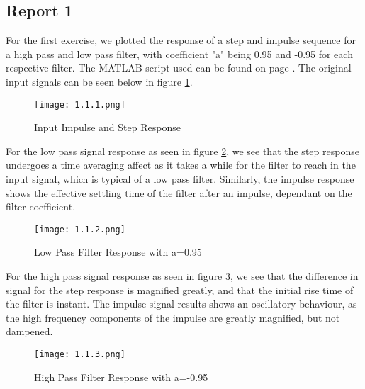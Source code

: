 \subsection*{Report 1}

	For the first exercise, we plotted the response of a step and impulse sequence for a high pass and low pass filter, with coefficient "a" being 0.95 and -0.95 for each respective filter. The MATLAB script used can be found on page \pageref{matlab_1.1}. The original input signals can be seen below in figure \ref{figure:1_1_1}. 
	
	\begin{figure}[H] 
		\centering
		\texttt{[image: 1.1.1.png]}
		\caption{Input Impulse and Step Response}
		\label{figure:1_1_1}
	\end{figure}
	
	For the low pass signal response as seen in figure \ref{figure:1_1_2}, we see that the step response undergoes a time averaging affect as it takes a while for the filter to reach in the input signal, which is typical of a low pass filter. Similarly, the impulse response shows the effective settling time of the filter after an impulse, dependant on the filter coefficient.
	
	\begin{figure}[H] 
		\centering
		\texttt{[image: 1.1.2.png]}
		\caption{Low Pass Filter Response with a=0.95}
		\label{figure:1_1_2}
	\end{figure}

	For the high pass signal response as seen in figure \ref{figure:1_1_3}, we see that the difference in signal for the step response is magnified greatly, and that the initial rise time of the filter is instant. The impulse signal results shows an oscillatory behaviour, as the high frequency components of the impulse are greatly magnified, but not dampened.
	
	\begin{figure}[H] 
		\centering
		\texttt{[image: 1.1.3.png]}
		\caption{High Pass Filter Response with a=-0.95}
		\label{figure:1_1_3}
	\end{figure}